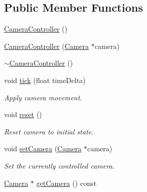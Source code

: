 \subsection*{Public Member Functions}
\begin{DoxyCompactItemize}
\item 
\mbox{\hyperlink{classec_1_1_camera_controller_a53fd061c49374fd8f1194cecac1e35aa}{Camera\+Controller}} ()
\item 
\mbox{\hyperlink{classec_1_1_camera_controller_a9edd8fff13533c84c7ea8f7f10f16580}{Camera\+Controller}} (\mbox{\hyperlink{classec_1_1_camera}{Camera}} $\ast$camera)
\item 
\mbox{\hyperlink{classec_1_1_camera_controller_a3229bd664f0d7d00b90fc3c9a852768c}{$\sim$\+Camera\+Controller}} ()
\item 
void \mbox{\hyperlink{classec_1_1_camera_controller_a82055ad6c8797937a8ec17234ab08758}{tick}} (float time\+Delta)
\begin{DoxyCompactList}\small\item\em Apply camera movement. \end{DoxyCompactList}\item 
void \mbox{\hyperlink{classec_1_1_camera_controller_a10d1642f398f155fa06c4c74961fe91f}{reset}} ()
\begin{DoxyCompactList}\small\item\em Reset camera to initial state. \end{DoxyCompactList}\item 
void \mbox{\hyperlink{classec_1_1_camera_controller_a74d3b80913b69dce0bae61a651c3b49b}{set\+Camera}} (\mbox{\hyperlink{classec_1_1_camera}{Camera}} $\ast$camera)
\begin{DoxyCompactList}\small\item\em Set the currently controlled camera. \end{DoxyCompactList}\item 
\mbox{\hyperlink{classec_1_1_camera}{Camera}} $\ast$ \mbox{\hyperlink{classec_1_1_camera_controller_a8d6e5c646108c0bf5abc25df3dd77c38}{get\+Camera}} () const
\end{DoxyCompactItemize}
